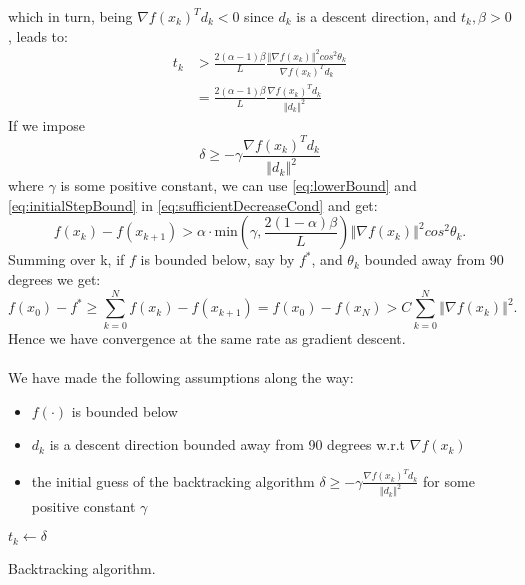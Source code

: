 \documentclass{article}
\newcommand{\norm}[1]{\left\Vert #1 \right\Vert}
\begin{document}
which in turn, being $\nabla f(x_k)^Td_k<0$ since $d_k$ is a descent direction, and $t_k,\beta>0$, leads to:
\begin{align}
	t_k &> \frac{2(\alpha-1)\beta}{L} \frac{\norm{\nabla f(x_k)}^2 cos^2\theta_k}{\nabla f(x_k)^Td_k} 	\label{eq:lowerBound}\\
	&=\frac{2(\alpha-1)\beta}{L}\frac{\nabla f(x_k)^Td_k}{\norm{d_k}^2}
\end{align}
If we impose
\begin{equation}
\delta\geq-\gamma\frac{\nabla f(x_k)^Td_k}{\norm{d_k}^2}
\label{eq:initialStepBound}
\end{equation}
where $\gamma$ is some positive constant, we can use \ref{eq:lowerBound} and \ref{eq:initialStepBound} in \ref{eq:sufficientDecreaseCond} and get:
\begin{equation}
f(x_k) - f(x_{k+1}) >\alpha\cdot \text{min}\left(\gamma,\frac{2(1-\alpha)\beta}{L}\right ) \norm{\nabla f(x_k)}^2 cos^2\theta_k.
\end{equation}
Summing over k, if $f$ is bounded below, say by $f^*$, and $\theta_k$ bounded away from 90 degrees we get:
\begin{equation}
	f(x_0)-f^* \geq \sum_{k=0}^N f(x_k) - f(x_{k+1})  = f(x_0)-f(x_N) > C\sum_{k=0}^N\norm{\nabla f(x_k)}^2.
	\label{eq:gradientNormInequality}
\end{equation}
Hence we have convergence at the same rate as gradient descent.\\\\
We have made the following assumptions along the way:
\begin{itemize}
	\item $f(\cdot)$ is bounded below
	\item $d_k$ is a descent direction bounded away from 90 degrees w.r.t $\nabla f(x_k)$
	\item the initial guess of the backtracking algorithm $\delta\geq- \gamma \frac{\nabla f(x_k)^Td_k}{\norm{d_k}^2}$ for some positive constant $\gamma$
\end{itemize}


\begin{algorithm}[!h]
	$t_k\gets \delta$\\
	\caption{Backtracking algorithm.}
	\label{algo:backtracking}
\end{algorithm}
\end{document}
